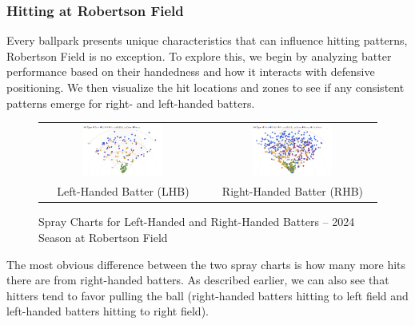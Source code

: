 \documentclass{article}
\begin{document}
\newpage
\subsubsection{Hitting at Robertson Field}

Every ballpark presents unique characteristics that can influence hitting patterns, Robertson Field is no exception. To explore this, we begin by analyzing batter performance based on their handedness and how it interacts with defensive positioning. We then visualize the hit locations and zones to see if any consistent patterns emerge for right- and left-handed batters.

\newpage
\begin{figure}[h]
    \centering
    \begin{tabular}{cc}  
        \includegraphics[width=0.5\textwidth]{images/LHB2024_spray_Robertson.png} & 
        \includegraphics[width=0.5\textwidth]{images/RHB2024_spray_Robertson.png} \\
         Left-Handed Batter (LHB) & Right-Handed Batter (RHB)
    \end{tabular}
    \caption{Spray Charts for Left-Handed and Right-Handed Batters – 2024 Season at Robertson Field}
    \label{fig:spray_charts_batter_handedness}
\end{figure}
\vspace{.5cm}

The most obvious difference between the two spray charts is how many more hits there are from right-handed batters. As described earlier, we can also see that hitters tend to favor pulling the ball (right-handed batters hitting to left field and left-handed batters hitting to right field). 
\end{document}
